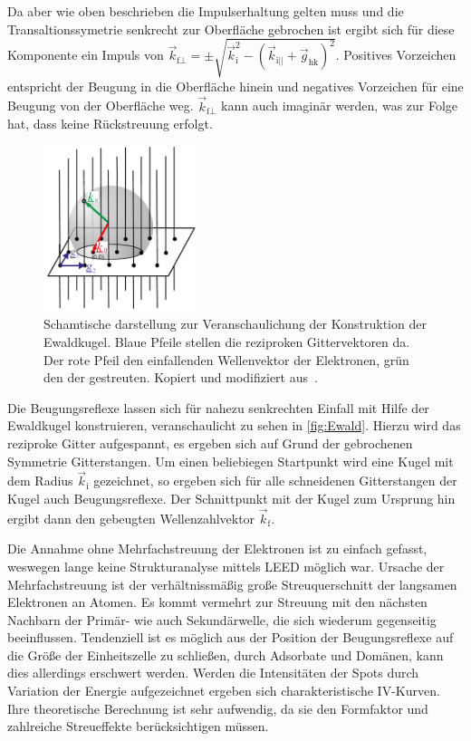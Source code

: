         Da aber wie oben beschrieben die Impulserhaltung gelten muss und die Transaltionssymetrie senkrecht zur Oberfläche gebrochen ist ergibt sich für diese Komponente ein Impuls von $\vec{k}_{\text{f}\perp} = \pm \sqrt{\vec{k}_\text{i}^2 - (\vec{k}_{\text{i}||} + \vec{g}_\text{hk})^2}$.
        Positives Vorzeichen entspricht der Beugung in die Oberfläche hinein und negatives Vorzeichen für eine Beugung von der Oberfläche weg.
        $\vec{k}_{\text{f}\perp}$ kann auch imaginär werden, was zur Folge hat, dass keine Rückstreuung erfolgt.
        \begin{figure}
            \centering
            \includegraphics[width=0.4\textwidth]{Ewald}
            \caption{Schamtische darstellung zur Veranschaulichung der Konstruktion der Ewaldkugel.
            Blaue Pfeile stellen die reziproken Gittervektoren da. 
            Der rote Pfeil den einfallenden Wellenvektor der Elektronen, grün den der gestreuten.
            Kopiert und modifiziert aus~\cite{Fauster}.}
            \label{fig:Ewald}
        \end{figure}
        Die Beugungsreflexe lassen sich für nahezu senkrechten Einfall mit Hilfe der Ewaldkugel konstruieren, veranschaulicht zu sehen in \autoref{fig:Ewald}.
        Hierzu wird das reziproke Gitter aufgespannt, es ergeben sich auf Grund der gebrochenen Symmetrie Gitterstangen.
        Um einen beliebiegen Startpunkt wird eine Kugel mit dem Radius $\vec{k}_\text{i}$ gezeichnet, so ergeben sich für alle schneidenen Gitterstangen der Kugel auch Beugungsreflexe.
        Der Schnittpunkt mit der Kugel zum Ursprung hin ergibt dann den gebeugten Wellenzahlvektor $\vec{k}_\text{f}$.

        Die Annahme ohne Mehrfachstreuung der Elektronen ist zu einfach gefasst, weswegen lange keine Strukturanalyse mittels LEED möglich war.
        Ursache der Mehrfachstreuung ist der verhältnissmäßig große Streuquerschnitt der langsamen Elektronen an Atomen.
        Es kommt vermehrt zur Streuung mit den nächsten Nachbarn der Primär- wie auch Sekundärwelle, die sich wiederum gegenseitig beeinflussen.
        Tendenziell ist es möglich aus der Position der Beugungsreflexe auf die Größe der Einheitszelle zu schließen, durch Adsorbate und Domänen, kann dies allerdings erschwert werden.
        Werden die Intensitäten der Spots durch Variation der Energie aufgezeichnet ergeben sich charakteristische IV-Kurven.
        Ihre theoretische Berechnung ist sehr aufwendig, da sie den Formfaktor und zahlreiche Streueffekte berücksichtigen müssen.
    
